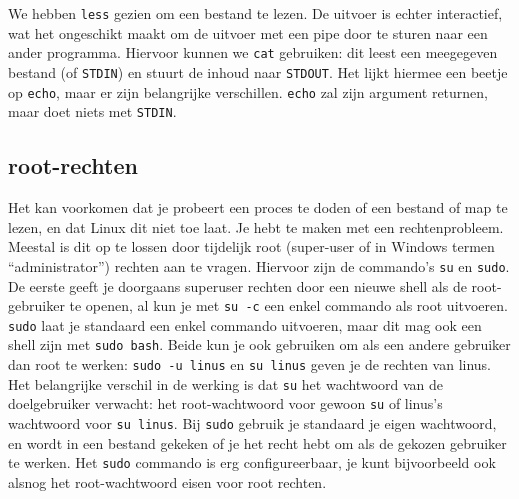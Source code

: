 We hebben \texttt{less} gezien om een bestand te lezen. De uitvoer is echter interactief, wat het ongeschikt maakt om de uitvoer met een pipe door te sturen naar een ander programma. Hiervoor kunnen we \texttt{cat} gebruiken: dit leest een meegegeven bestand (of \texttt{STDIN}) en stuurt de inhoud naar \texttt{STDOUT}. Het lijkt hiermee een beetje op \texttt{echo}, maar er zijn belangrijke verschillen. \texttt{echo} zal zijn argument returnen, maar doet niets met \texttt{STDIN}.


\subsection{root-rechten}\label{root-rechten}

Het kan voorkomen dat je probeert een proces te doden of een bestand of map te lezen, en dat Linux dit niet toe laat. Je hebt te maken met een rechtenprobleem. Meestal is dit op te lossen door tijdelijk root (super-user of in Windows termen ``administrator'') rechten aan te vragen. Hiervoor zijn de commando's \texttt{su} en \texttt{sudo}. De eerste geeft je doorgaans superuser rechten door een nieuwe shell als de root-gebruiker te openen, al kun je met \texttt{su\ -c} een enkel commando als root uitvoeren. \texttt{sudo} laat je standaard een enkel commando uitvoeren, maar dit mag ook een shell zijn met \texttt{sudo\ bash}. Beide kun je ook gebruiken om als een andere gebruiker dan root te werken: \texttt{sudo\ -u\ linus} en \texttt{su\ linus} geven je de rechten van linus. Het belangrijke verschil in de werking is dat \texttt{su} het wachtwoord van de doelgebruiker verwacht: het root-wachtwoord voor gewoon \texttt{su} of linus's wachtwoord voor \texttt{su\ linus}. Bij \texttt{sudo} gebruik je standaard je eigen wachtwoord, en wordt in een bestand gekeken of je het recht hebt om als de gekozen gebruiker te werken. Het \texttt{sudo} commando is erg configureerbaar, je kunt bijvoorbeeld ook alsnog het root-wachtwoord eisen voor root rechten.

